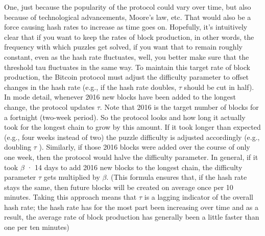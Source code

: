 One, just because the popularity of the protocol could vary over time, but also because
of technological advancements, Moore’s law, etc. That would also be a force causing
hash rates to increase as time goes on. Hopefully, it’s intuitively clear that if you want to
keep the rates of block production, in other words, the frequency with which puzzles get
solved, if you want that to remain roughly constant, even as the hash rate fluctuates, well,
you better make sure that the threshold tau fluctuates in the same way.
To maintain this target rate of block production, the Bitcoin protocol must adjust the
difficulty parameter to offset changes in the hash rate (e.g., if the hash rate doubles, $\tau$ should
be cut in half). In mode detail, whenever 2016 new blocks have been added to the longest change, the protocol updates $\tau$. Note that 2016 is the target number of blocks for a fortnight
(two-week period). So the protocol looks and how long it actually took for the longest chain
to grow by this amount. If it took longer than expected (e.g., four weeks instead of two) the
puzzle difficulty is adjusted accordingly (e.g., doubling $\tau$ ). Similarly, if those 2016 blocks
were added over the course of only one week, then the protocol would halve the difficulty
parameter. In general, if it took $\beta$ · 14 days to add 2016 new blocks to the longest chain, the
difficulty parameter $\tau$ gets multiplied by $\beta$. (This formula ensures that, if the hash rate stays the same, then future blocks will be created on average
once per 10 minutes. Taking this approach means that $\tau$ is a lagging indicator of the overall hash rate; the hash rate
has for the most part been increasing over time and as a result, the average rate of block production has
generally been a little faster than one per ten minutes)

